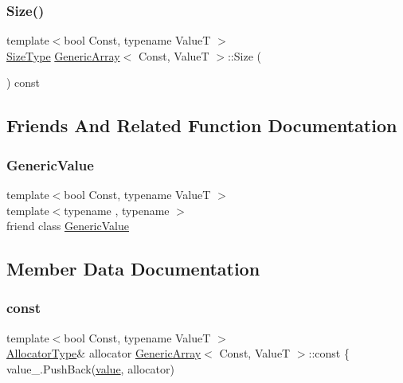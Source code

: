 \mbox{\label{classGenericArray_a62d5b7f423edc2141cd4524c7dfd138b}} 
\subsubsection{\texorpdfstring{Size()}{Size()}}
{\footnotesize\ttfamily template$<$bool Const, typename ValueT $>$ \\
\hyperlink{rapidjson_8h_a5ed6e6e67250fadbd041127e6386dcb5}{Size\+Type} \hyperlink{classGenericArray}{Generic\+Array}$<$ Const, ValueT $>$\+::Size (\begin{DoxyParamCaption}{ }\end{DoxyParamCaption}) const\hspace{0.3cm}{\ttfamily [inline]}}



\subsection{Friends And Related Function Documentation}
\mbox{\label{classGenericArray_a899449e1a645b5e377af059fb61113d8}} 
\subsubsection{\texorpdfstring{Generic\+Value}{GenericValue}}
{\footnotesize\ttfamily template$<$bool Const, typename ValueT $>$ \\
template$<$typename , typename $>$ \\
friend class \hyperlink{classGenericValue}{Generic\+Value}\hspace{0.3cm}{\ttfamily [friend]}}



\subsection{Member Data Documentation}
\mbox{\label{classGenericArray_a25d2ed55daa117c41db6a5b3f87e9ddc}} 
\subsubsection{\texorpdfstring{const}{const}}
{\footnotesize\ttfamily template$<$bool Const, typename ValueT $>$ \\
\hyperlink{classGenericArray_af9cdc12de03c742b9c33dfc172756b97}{Allocator\+Type}\& allocator \hyperlink{classGenericArray}{Generic\+Array}$<$ Const, ValueT $>$\+::const \{ value\+\_\+.\+Push\+Back(\hyperlink{imgui__impl__opengl3__loader_8h_a32aff7c6c4cd253fdf6563677afab5ce}{value}, allocator)}

